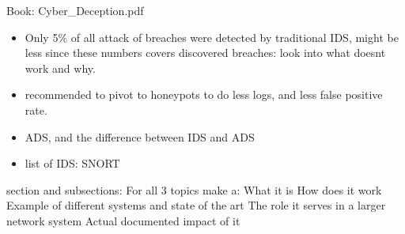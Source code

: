 
Book: Cyber\_Deception.pdf
\begin{itemize}
    \item Only 5\% of all attack of breaches were detected by traditional IDS, might be less since these numbers covers discovered breaches: look into what doesnt work and why.
    \item recommended to pivot to honeypots to do less logs, and less false positive rate.
    \item ADS, and the difference between IDS and ADS
    \item list of IDS: SNORT
\end{itemize}

section and subsections:
For all 3 topics make a:
What it is
How does it work
Example of different systems and state of the art
The role it serves in a larger network system
Actual documented impact of it

